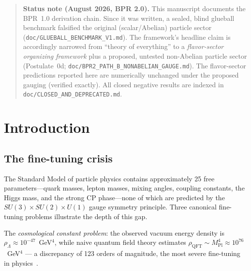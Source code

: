 \documentclass[aps,prd,twocolumn,superscriptaddress,longbibliography,nofootinbib]{revtex4-2}
\begin{document}
\maketitle

\begin{quote}
\textbf{Status note (August 2026, BPR 2.0).}  This manuscript
documents the BPR~1.0 derivation chain.  Since it was written, a
sealed, blind glueball benchmark falsified the original
(scalar/Abelian) particle sector
(\texttt{doc/GLUEBALL\_BENCHMARK\_V1.md}).  The framework's headline
claim is accordingly narrowed from ``theory of everything'' to a
\emph{flavor-sector organizing framework} plus a proposed, untested
non-Abelian particle sector (Postulate~0d;
\texttt{doc/BPR2\_PATH\_B\_NONABELIAN\_GAUGE.md}).  The flavor-sector
predictions reported here are numerically unchanged under the
proposed gauging (verified exactly).  All closed negative results are
indexed in \texttt{doc/CLOSED\_AND\_DEPRECATED.md}.
\end{quote}


\section{Introduction}
\label{sec:intro}

\subsection{The fine-tuning crisis}

The Standard Model of particle physics contains approximately 25 free
parameters---quark masses, lepton masses, mixing angles, coupling constants,
the Higgs mass, and the strong CP phase---none of which are predicted by the
$SU(3) \times SU(2) \times U(1)$ gauge symmetry principle.  Three canonical
fine-tuning problems illustrate the depth of this gap.

The \textit{cosmological constant problem}: the observed vacuum energy density
is $\rho_\Lambda \approx 10^{-47}$~GeV$^4$, while naive quantum field theory
estimates $\rho_{\mathrm{QFT}} \sim M_{\mathrm{Pl}}^4 \approx 10^{76}$~GeV$^4$
--- a discrepancy of 123 orders of magnitude, the most severe fine-tuning in
physics~\cite{Weinberg1989}.
\end{document}
